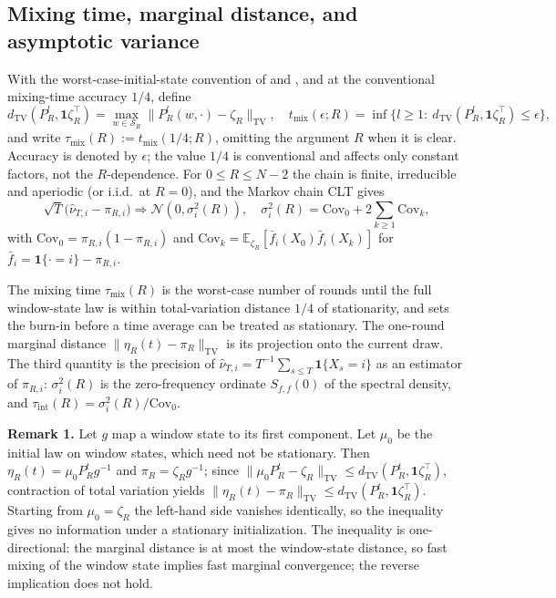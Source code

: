 \documentclass[twoside,11pt]{article}
\begin{document}
\subsection{Mixing time, marginal distance, and asymptotic variance}
With the worst-case-initial-state convention of \citep[Def.~4]{ref1} and \citep[Def.~2.2]{ref13}, and at the conventional mixing-time accuracy $1/4$, define
\begin{equation}\label{eq:e02}
d_{\mathrm{TV}}(P_R^{l},\mathbf{1}\zeta_R^{\top}) =\max_{w\in\mathcal{S}_R}\|P_R^{l}(w,\cdot)-\zeta_R\|_{\mathrm{TV}},\quad t_{\mathrm{mix}}(\epsilon;R) =\inf\{l\geq1:\ d_{\mathrm{TV}}(P_R^{l},\mathbf{1}\zeta_R^{\top})\leq\epsilon\},
\end{equation}
and write $\tau_{\mathrm{mix}}(R):=t_{\mathrm{mix}}(1/4;R)$, omitting the argument $R$ when it is clear. Accuracy is denoted by $\epsilon$; the value $1/4$ is conventional and affects only constant factors, not the $R$-dependence. For $0\leq R\leq N-2$ the chain is finite, irreducible and aperiodic (or i.i.d.\ at $R=0$), and the Markov chain CLT gives
\begin{equation}\label{eq:e03}
\sqrt{T}\big(\hat\nu_{T,i}-\pi_{R,i}\big) \Rightarrow\mathcal{N}(0,\sigma_i^{2}(R)),\quad \sigma_i^{2}(R) =\mathrm{Cov}_0+2\sum_{k\geq1}\mathrm{Cov}_k,
\end{equation}
with $\mathrm{Cov}_0=\pi_{R,i}(1-\pi_{R,i})$ and $\mathrm{Cov}_k=\mathbb{E}_{\zeta_R}[\bar f_i(X_0)\bar f_i(X_k)]$ for $\bar f_i=\mathbf{1}\{\cdot=i\}-\pi_{R,i}$.

The mixing time $\tau_{\mathrm{mix}}(R)$ is the worst-case number of rounds
until the full window-state law is within total-variation distance $1/4$ of
stationarity, and sets the burn-in before a time average can be treated as
stationary. The one-round marginal distance
$\|\eta_R(t)-\pi_R\|_{\mathrm{TV}}$ is its projection onto the current draw. The third quantity is the precision of
$\hat\nu_{T,i}=T^{-1}\sum_{s\le T}\mathbf{1}\{X_s=i\}$ as an estimator of
$\pi_{R,i}$: $\sigma_i^{2}(R)$ is the zero-frequency ordinate $S_{f,f}(0)$
of the spectral density, and
$\tau_{\mathrm{int}}(R)=\sigma_i^{2}(R)/\mathrm{Cov}_0$.

\textbf{Remark 1.} Let $g$ map a window state to its first component. Let $\mu_0$ be the initial law on window states, which need not be stationary. Then $\eta_R(t)=\mu_0P_R^{t}g^{-1}$ and $\pi_R=\zeta_R g^{-1}$; since $\|\mu_0P_R^{t}-\zeta_R\|_{\mathrm{TV}}\leq d_{\mathrm{TV}}(P_R^{t},\mathbf{1}\zeta_R^{\top})$, contraction of total variation yields $\|\eta_R(t)-\pi_R\|_{\mathrm{TV}}\leq d_{\mathrm{TV}}(P_R^{t},\mathbf{1}\zeta_R^{\top})$. Starting from $\mu_0=\zeta_R$ the left-hand side vanishes identically, so the inequality gives no information under a stationary initialization. The inequality is one-directional: the marginal distance is at most the window-state distance, so fast mixing of the window state implies fast marginal convergence; the reverse implication does not hold.
\end{document}
